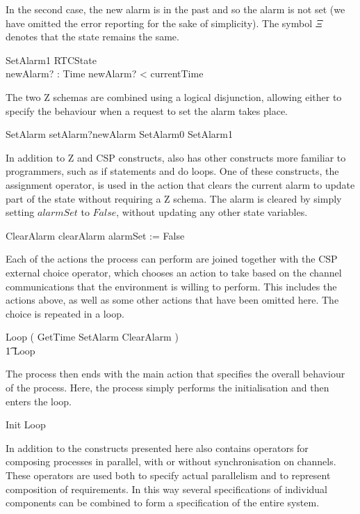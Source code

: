 %
In the second case, the new alarm is in the past and so the alarm is
not set (we have omitted the error reporting for the sake of
simplicity).
The symbol $\Xi$ denotes that the state remains the same.
%
\begin{schema}{SetAlarm1}
  \Xi RTCState \\
  newAlarm? : Time
\where
  newAlarm? < currentTime
\end{schema}
%
The two Z schemas are combined using a logical disjunction, allowing
either to specify the behaviour when a request to set the alarm takes
place.
%
\begin{circusaction}
  SetAlarm \circdef setAlarm?newAlarm \then \lschexpract SetAlarm0 \lor SetAlarm1 \rschexpract
\end{circusaction}
%
In addition to Z and CSP constructs, \Circus{} also has other
constructs more familiar to programmers, such as if statements and do
loops.
One of these constructs, the assignment operator, is used in the
action that clears the current alarm to update part of the state
without requiring a Z schema.
The alarm is cleared by simply setting $alarmSet$ to $False$, without
updating any other state variables.
%
\begin{circusaction}
  ClearAlarm \circdef clearAlarm \then alarmSet := False
\end{circusaction}
%
Each of the actions the process can perform are joined together with
the CSP external choice operator, which chooses an action to take
based on the channel communications that the environment is willing to
perform.
This includes the actions above, as well as some other actions that
have been omitted here.
The choice is repeated in a loop.
%
\begin{circusaction}
  Loop \circdef \left( GetTime \extchoice SetAlarm \extchoice
    ClearAlarm
    \extchoice \cdots \right) \\
  \t1 \circseq Loop
\end{circusaction}
%
The \Circus{} process then ends with the main action that specifies
the overall behaviour of the process.
Here, the process simply performs the initialisation and then enters
the loop.
%
\begin{circusaction}
  \circspot Init \circseq Loop
\end{circusaction}
\begin{circus}
  \circend
\end{circus}

In addition to the constructs presented here \Circus{} also contains
operators for composing processes in parallel, with or without
synchronisation on channels.
These operators are used both to specify actual parallelism and to
represent composition of requirements.
In this way several \Circus{} specifications of individual components
can be combined to form a specification of the entire system.

